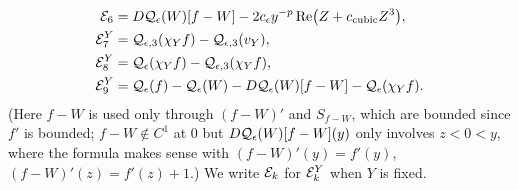 \begin{definition}
\begin{align}
    \mathcal{E}_6&=D\mathcal{Q}_\epsilon(W)[f-W]-2c_\epsilon y^{-p}\operatorname{Re}\bigl(Z+c_{\textup{cubic}}Z^3\bigr),\label{eqn:approx_E6}\\
    \mathcal{E}_7^{Y}&=\mathcal{Q}_{\epsilon,3}(\chi_Yf)-\mathcal{Q}_{\epsilon,3}(v_Y),\label{eqn:approx_E7}\\
    \mathcal{E}_8^{Y}&=\mathcal{Q}_\epsilon(\chi_Yf)-\mathcal{Q}_{\epsilon,3}(\chi_Yf),\label{eqn:approx_E8}\\
    \mathcal{E}_9^{Y}&=\mathcal{Q}_\epsilon(f)-\mathcal{Q}_\epsilon(W)-D\mathcal{Q}_\epsilon(W)[f-W]-\mathcal{Q}_\epsilon(\chi_Yf).\label{eqn:approx_E9}
  \end{align}
  (Here $f-W$ is used only through $(f-W)'$ and $S_{f-W}$, which are bounded since $f'$ is bounded; $f-W\notin C^1$ at $0$ but
  $D\mathcal{Q}_\epsilon(W)[f-W](y)$ only involves $z<0<y$, where the formula makes sense with $(f-W)'(y)=f'(y)$, $(f-W)'(z)=f'(z)+1$.)
  We write $\mathcal{E}_k$ for $\mathcal{E}_k^Y$ when $Y$ is fixed.
\end{definition}

